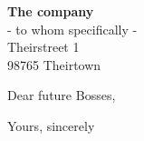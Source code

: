 \documentclass[brief]{scrlttr2}
\newcommand{\adressant}{
    \textbf{The company}\\
    - to whom specifically -\\
    Theirstreet 1\\
    98765 Theirtown
    }
\begin{document}
\begin{letter}{\adressant}
\opening{Dear future Bosses,}
\vspace{-0.7em}
\lipsum[2-4]
\closing{Yours, sincerely}
\end{letter}
\end{document}
